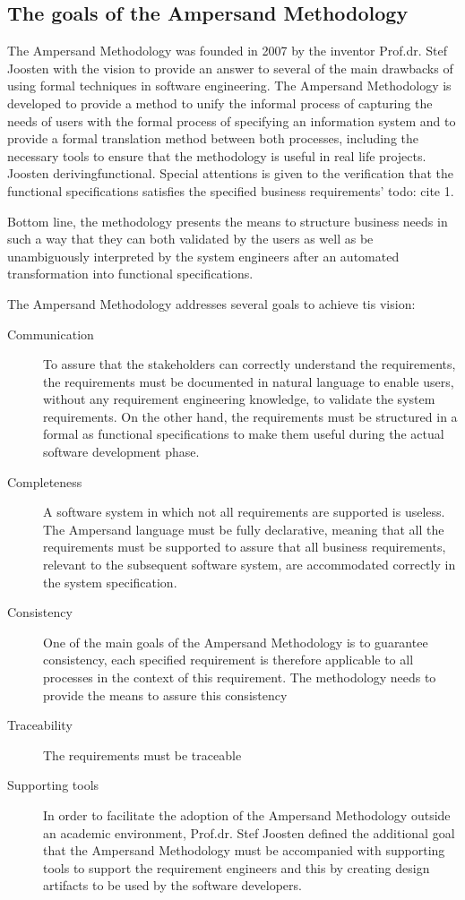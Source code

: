 \subsection{The goals of the Ampersand Methodology}
   
The Ampersand Methodology was founded in 2007 by the inventor Prof.dr. Stef Joosten with the vision to provide an answer to several of the main drawbacks of using formal techniques  in software engineering. 
The Ampersand Methodology is  developed to provide a method to unify the informal process of capturing the needs of users with the formal process of specifying an information system and to provide a formal translation method between both processes, including the necessary tools to ensure that the methodology is useful in real life projects.
Joosten derivingfunctional. Special attentions is given to the verification that the functional specifications satisfies the specified business requirements' todo: cite 1. 

Bottom line, the methodology presents the means to structure business needs in such a way that they can both validated by the users as well as be unambiguously interpreted by the system engineers after an automated transformation into functional specifications.

The Ampersand Methodology addresses several goals to achieve tis vision:
\begin{description}
	\item[Communication]  To assure that the stakeholders can correctly understand the requirements, the requirements must be documented in natural language to enable users, without any requirement engineering knowledge, to validate the system requirements. On the other hand, the requirements must be structured in a formal as functional specifications to make them useful during the actual software development phase. 
	\item[Completeness]A software system in which not all requirements are supported is useless. The Ampersand language must be fully declarative, meaning that all the requirements must be supported to assure that all business requirements, relevant to the subsequent software system, are accommodated correctly in the system specification.
	\item[Consistency]One of the main goals of the Ampersand Methodology is to guarantee consistency, each specified requirement is therefore applicable to all processes in the context of this requirement. The methodology needs to provide the means to assure this consistency
	\item[Traceability] The requirements must be traceable 
	\item[Supporting tools] In order to facilitate the adoption of the Ampersand Methodology outside an academic environment, Prof.dr. Stef Joosten defined the additional goal that the Ampersand Methodology must be accompanied with supporting tools to support the requirement engineers and this by creating design artifacts to be used by the software developers.
\end{description}

